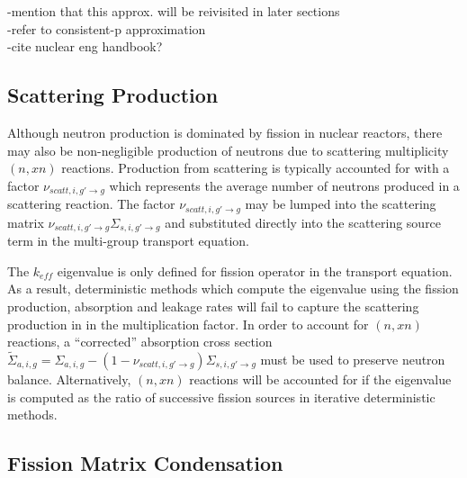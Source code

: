 

-mention that this approx. will be reivisited in later sections\\
-refer to consistent-p approximation \\
-cite nuclear eng handbook?\\


\subsection{Scattering Production}
\label{sec:chap2-scatt-prod}

Although neutron production is dominated by fission in nuclear reactors, there may also be non-negligible production of neutrons due to scattering multiplicity $(n,xn)$ reactions. Production from scattering is typically accounted for with a factor $\nu_{scatt,i,g' \rightarrow g}$ which represents the average number of neutrons produced in a scattering reaction. The factor $\nu_{scatt,i,g' \rightarrow g}$ may be lumped into the scattering matrix $\nu_{scatt,i,g' \rightarrow g}\Sigma_{s,i,g' \rightarrow g}$ and substituted directly into the scattering source term in the multi-group transport equation. 

The $k_{eff}$ eigenvalue is only defined for fission operator in the transport equation. As a result, deterministic methods which compute the eigenvalue using the fission production, absorption and leakage rates will fail to capture the scattering production in in the multiplication factor. In order to account for $(n,xn)$ reactions, a ``corrected'' absorption cross section $\tilde{\Sigma}_{a,i,g} = \Sigma_{a,i,g} - (1-\nu_{scatt,i,g' \rightarrow g})\Sigma_{s,i,g' \rightarrow g}$ must be used to preserve neutron balance. Alternatively, $(n,xn)$ reactions will be accounted for if the eigenvalue is computed as the ratio of successive fission sources in iterative deterministic methods.


\subsection{Fission Matrix Condensation}
\label{sec:chap2-fiss-mat}

